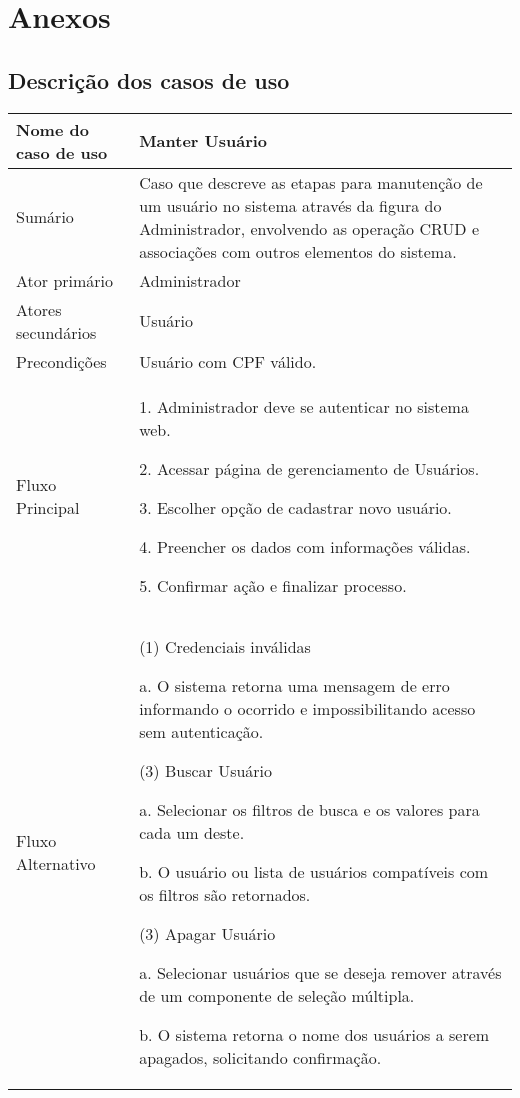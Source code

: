 \appendix
\chapter{Anexos}
\label{cap:anexos}

\section{Descrição dos casos de uso}

\begin{flushleft}
\tablefirsthead{}
\tablehead{}
\tabletail{}
\tablelasttail{}
\begin{supertabular}{|m{5.5680003cm}|m{9.325cm}|}
\hline
Nome do caso de uso &
Manter Usuário\\\hline
Sumário &
Caso que descreve as etapas para manutenção de um usuário no sistema através da figura do Administrador, envolvendo as operação CRUD e associações com outros elementos do sistema.\\\hline
Ator primário &
Administrador\\\hline
Atores secundários &
Usuário\\\hline
Precondições &
Usuário com CPF válido.\\\hline
Fluxo Principal &
1. Administrador deve se autenticar no sistema web.

2. Acessar página de gerenciamento de Usuários.

3. Escolher opção de cadastrar novo usuário.

4. Preencher os dados com informações válidas.

5. Confirmar ação e finalizar processo.\\\hline
Fluxo Alternativo &
(1) Credenciais inválidas

a. O sistema retorna uma mensagem de erro informando o ocorrido e impossibilitando acesso sem autenticação.

(3) Buscar Usuário

a. Selecionar os filtros de busca e os valores para cada um deste.

b. O usuário ou lista de usuários compatíveis com os filtros são retornados.

(3) Apagar Usuário

a. Selecionar usuários que se deseja remover através de um componente de seleção múltipla.

b. O sistema retorna o nome dos usuários a serem apagados, solicitando confirmação.


\end{supertabular}
\end{flushleft}
